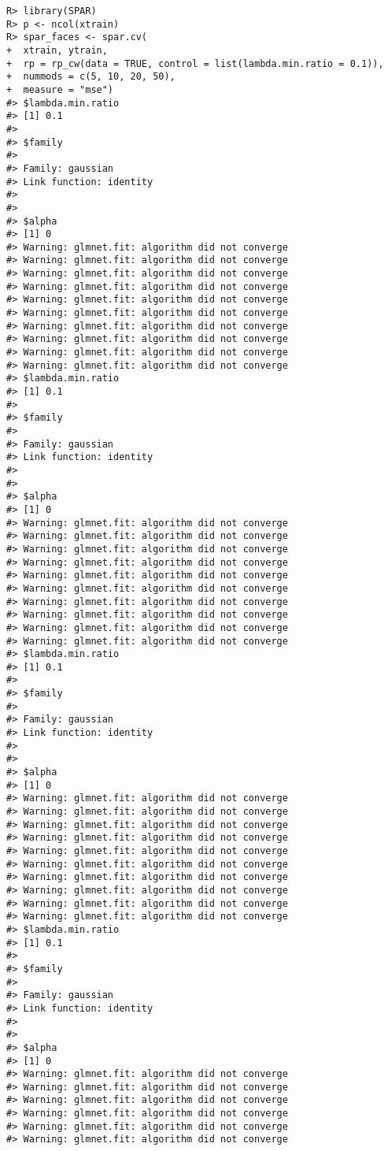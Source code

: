 \documentclass[
  article]{jss}
\begin{document}
\begin{verbatim}
R> library(SPAR)
R> p <- ncol(xtrain)
R> spar_faces <- spar.cv(
+  xtrain, ytrain,
+  rp = rp_cw(data = TRUE, control = list(lambda.min.ratio = 0.1)),
+  nummods = c(5, 10, 20, 50),
+  measure = "mse")
#> $lambda.min.ratio
#> [1] 0.1
#> 
#> $family
#> 
#> Family: gaussian 
#> Link function: identity 
#> 
#> 
#> $alpha
#> [1] 0
#> Warning: glmnet.fit: algorithm did not converge
#> Warning: glmnet.fit: algorithm did not converge
#> Warning: glmnet.fit: algorithm did not converge
#> Warning: glmnet.fit: algorithm did not converge
#> Warning: glmnet.fit: algorithm did not converge
#> Warning: glmnet.fit: algorithm did not converge
#> Warning: glmnet.fit: algorithm did not converge
#> Warning: glmnet.fit: algorithm did not converge
#> Warning: glmnet.fit: algorithm did not converge
#> Warning: glmnet.fit: algorithm did not converge
#> $lambda.min.ratio
#> [1] 0.1
#> 
#> $family
#> 
#> Family: gaussian 
#> Link function: identity 
#> 
#> 
#> $alpha
#> [1] 0
#> Warning: glmnet.fit: algorithm did not converge
#> Warning: glmnet.fit: algorithm did not converge
#> Warning: glmnet.fit: algorithm did not converge
#> Warning: glmnet.fit: algorithm did not converge
#> Warning: glmnet.fit: algorithm did not converge
#> Warning: glmnet.fit: algorithm did not converge
#> Warning: glmnet.fit: algorithm did not converge
#> Warning: glmnet.fit: algorithm did not converge
#> Warning: glmnet.fit: algorithm did not converge
#> Warning: glmnet.fit: algorithm did not converge
#> $lambda.min.ratio
#> [1] 0.1
#> 
#> $family
#> 
#> Family: gaussian 
#> Link function: identity 
#> 
#> 
#> $alpha
#> [1] 0
#> Warning: glmnet.fit: algorithm did not converge
#> Warning: glmnet.fit: algorithm did not converge
#> Warning: glmnet.fit: algorithm did not converge
#> Warning: glmnet.fit: algorithm did not converge
#> Warning: glmnet.fit: algorithm did not converge
#> Warning: glmnet.fit: algorithm did not converge
#> Warning: glmnet.fit: algorithm did not converge
#> Warning: glmnet.fit: algorithm did not converge
#> Warning: glmnet.fit: algorithm did not converge
#> Warning: glmnet.fit: algorithm did not converge
#> $lambda.min.ratio
#> [1] 0.1
#> 
#> $family
#> 
#> Family: gaussian 
#> Link function: identity 
#> 
#> 
#> $alpha
#> [1] 0
#> Warning: glmnet.fit: algorithm did not converge
#> Warning: glmnet.fit: algorithm did not converge
#> Warning: glmnet.fit: algorithm did not converge
#> Warning: glmnet.fit: algorithm did not converge
#> Warning: glmnet.fit: algorithm did not converge
#> Warning: glmnet.fit: algorithm did not converge

\end{verbatim}
\end{document}
